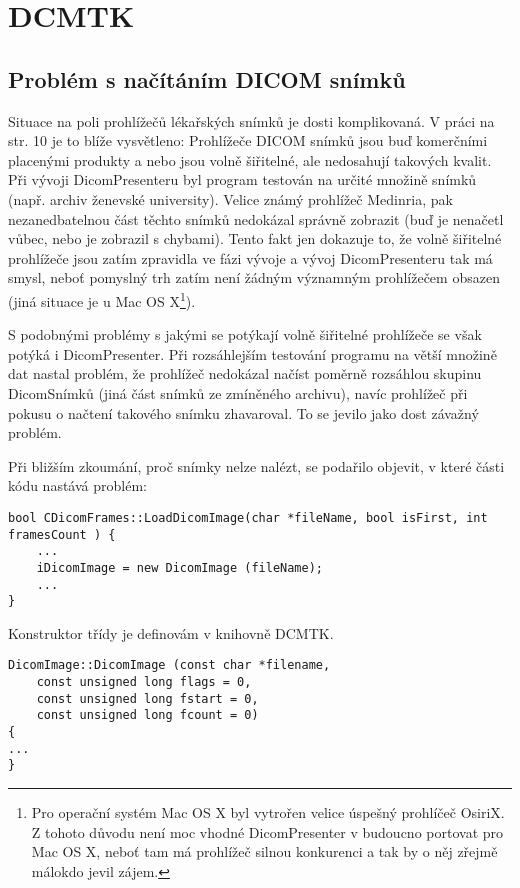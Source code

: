 \newpage
\chapter{DCMTK}
\section{Problém s načítáním DICOM snímků}
Situace na poli prohlížečů lékařských snímků je dosti komplikovaná. V práci\cite{flaska} na str. 10 je to blíže vysvětleno: Prohlížeče DICOM snímků jsou buď komerčními placenými produkty a nebo jsou volně šiřitelné, ale nedosahují takových kvalit. Při vývoji DicomPresenteru byl program testován na určité množině snímků (např. archiv ženevské university). Velice známý prohlížeč Medinria, pak nezanedbatelnou část těchto snímků nedokázal správně zobrazit (buď je nenačetl vůbec, nebo je zobrazil s chybami). Tento fakt jen dokazuje to, že volně šiřitelné prohlížeče jsou zatím zpravidla ve fázi vývoje a vývoj DicomPresenteru tak má smysl, neboť pomyslný trh zatím není žádným významným prohlížečem obsazen (jiná situace je u Mac OS X\footnote{Pro operační systém Mac OS X byl vytrořen velice úspešný prohlíčeč OsiriX. Z tohoto důvodu není moc vhodné DicomPresenter v budoucno portovat pro Mac OS X, neboť tam má prohlížeč silnou konkurenci a tak by o něj zřejmě málokdo jevil zájem.}).

S podobnými problémy s jakými se potýkají volně šiřitelné prohlížeče se však potýká i DicomPresenter. Při rozsáhlejším testování programu na větší množině dat nastal problém, že prohlížeč nedokázal načíst poměrně rozsáhlou skupinu DicomSnímků (jiná část snímků ze zmíněného archivu), navíc prohlížeč při pokusu o načtení takového snímku zhavaroval. To se jevilo jako dost závažný problém.

Při bližším zkoumání, proč snímky nelze nalézt, se podařilo objevit, v které části kódu nastává problém:

\begin{lstlisting}[label=DicomImageClass,caption={Při otevírání snímku aplikace havarovala, k pádu aplikace došlo ve funkci \clist{CDicomFramed::LoadDicomImage} na uvedeném řádku (zde řádek 3).}]
bool CDicomFrames::LoadDicomImage(char *fileName, bool isFirst, int framesCount ) {
 	...
	iDicomImage = new DicomImage (fileName);
	...	
}
\end{lstlisting}

Konstruktor třídy  je definovám v knihovně DCMTK.

\begin{lstlisting}[label={DicomImage},caption={Definice konstruktoru třídy \clist{DicomImage}.}]
DicomImage::DicomImage (const char *filename,
    const unsigned long flags = 0,
    const unsigned long fstart = 0,
    const unsigned long fcount = 0)
{
...
}
\end{lstlisting}

